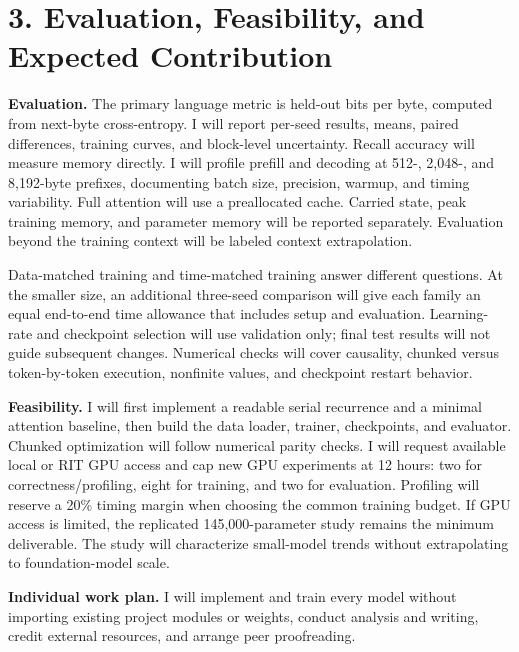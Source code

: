 \documentclass[11pt,letterpaper]{article}
\begin{document}
\newpage
\section*{3. Evaluation, Feasibility, and Expected Contribution}

\textbf{Evaluation.} The primary language metric is held-out bits per byte, computed from next-byte cross-entropy. I will report per-seed results, means, paired differences, training curves, and block-level uncertainty. Recall accuracy will measure memory directly. I will profile prefill and decoding at 512-, 2,048-, and 8,192-byte prefixes, documenting batch size, precision, warmup, and timing variability. Full attention will use a preallocated cache. Carried state, peak training memory, and parameter memory will be reported separately. Evaluation beyond the training context will be labeled context extrapolation.

Data-matched training and time-matched training answer different questions. At the smaller size, an additional three-seed comparison will give each family an equal end-to-end time allowance that includes setup and evaluation. Learning-rate and checkpoint selection will use validation only; final test results will not guide subsequent changes. Numerical checks will cover causality, chunked versus token-by-token execution, nonfinite values, and checkpoint restart behavior.

\textbf{Feasibility.} I will first implement a readable serial recurrence and a minimal attention baseline, then build the data loader, trainer, checkpoints, and evaluator. Chunked optimization will follow numerical parity checks. I will request available local or RIT GPU access and cap new GPU experiments at 12 hours: two for correctness/profiling, eight for training, and two for evaluation. Profiling will reserve a 20\% timing margin when choosing the common training budget. If GPU access is limited, the replicated 145,000-parameter study remains the minimum deliverable. The study will characterize small-model trends without extrapolating to foundation-model scale.

\textbf{Individual work plan.} I will implement and train every model without importing existing project modules or weights, conduct analysis and writing, credit external resources, and arrange peer proofreading.
\end{document}
